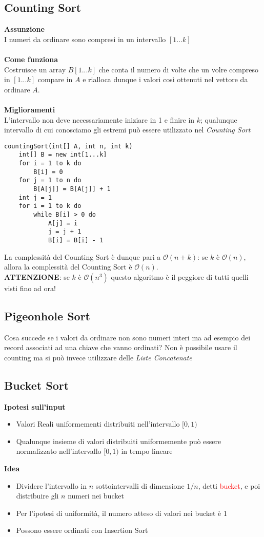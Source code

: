 \documentclass[../cheatSheetAlgoritmi.tex]{subfiles}
\begin{document}
\subsection{Counting Sort}
\textbf{Assunzione}\\
I numeri da ordinare sono compresi in un intervallo $[1...k]$\\\\
\textbf{Come funziona}\\
Costruisce un array $B[1...k]$ che conta il numero di volte che un volre compreso in $[1...k]$ compare in $A$ e rialloca dunque i valori così ottenuti nel vettore da ordinare $A$.\\\\
\textbf{Miglioramenti}\\
L'intervallo non deve necessariamente iniziare in 1 e finire in $k$; qualunque intervallo di cui conosciamo gli estremi può essere utilizzato nel \emph{Counting Sort}
\begin{lstlisting}[caption=Counting Sort]
countingSort(int[] A, int n, int k)
	int[] B = new int[1...k]
	for i = 1 to k do
		B[i] = 0
	for j = 1 to n do
		B[A[j]] = B[A[j]] + 1
	int j = 1
	for i = 1 to k do
		while B[i] > 0 do
			A[j] = i
			j = j + 1
			B[i] = B[i] - 1
\end{lstlisting}
La complessità del Counting Sort è dunque pari a $\mathcal{O}(n + k)$: se $k$ è $\mathcal{O}(n)$, allora la complessità del Counting Sort è $\mathcal{O}(n)$.\\
\textbf{ATTENZIONE}: se $k$ è $\mathcal{O}(n^{3})$ questo algoritmo è il peggiore di tutti quelli visti fino ad ora!
\subsection{Pigeonhole Sort}
Cosa succede se i valori da ordinare non sono numeri interi ma ad esempio dei record associati ad una chiave che vanno ordinati? Non è possibile usare il counting ma si può invece utilizzare delle \emph{Liste Concatenate}
\subsection{Bucket Sort}
\textbf{Ipotesi sull'input}
\begin{itemize}
	\item Valori Reali uniformementi distribuiti nell'intervallo $[0, 1)$
	\item Qualunque insieme di valori distribuiti uniformemente può essere normalizzato nell'intervallo $[0, 1)$ in tempo lineare
\end{itemize}
\textbf{Idea}
\begin{itemize}
	\item Dividere l'intervallo in $n$ sottointervalli di dimensione $1/n$, detti \textcolor{red}{bucket}, e poi distribuire gli $n$ numeri nei bucket
	\item Per l'ipotesi di uniformità, il numero atteso di valori nei bucket è 1
	\item Possono essere ordinati con Insertion Sort
\end{itemize}
\end{document}
